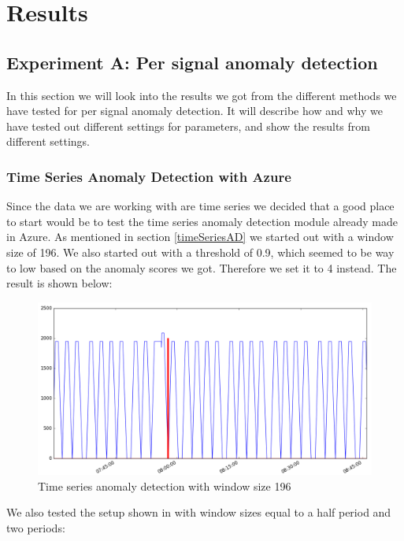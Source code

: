 \documentclass[english, a4paper]{report}
\begin{document}
\chapter{Results}
{
    \section{Experiment A: Per signal anomaly detection}\label{PerSignalAnomRes}
    {
        In this section we will look into the results we got from the different methods we have tested for per signal anomaly detection. It will describe how and why we have tested out different settings for parameters, and show the results from different settings. 
        
        \subsection{Time Series Anomaly Detection with Azure}\label{AnomAzure}
        {
            Since the data we are working with are time series we decided that a good place to start would be to test the time series anomaly detection module already made in Azure. As mentioned in section \ref{timeSeriesAD} we started out with a window size of 196. We also started out with a threshold of 0.9, which seemed to be way to low based on the anomaly scores we got. Therefore we set it to 4 instead. The result is shown below:
            
            \begin{figure}[H]
                \centering
                \includegraphics[width=\textwidth]{Window-196}
                \caption{Time series anomaly detection with window size 196}
                \label{fig:timeSeriesADWindow196}
            \end{figure}
            
            We also tested the setup shown in  with window sizes equal to a half period and two periods:
            
}}}
\end{document}
